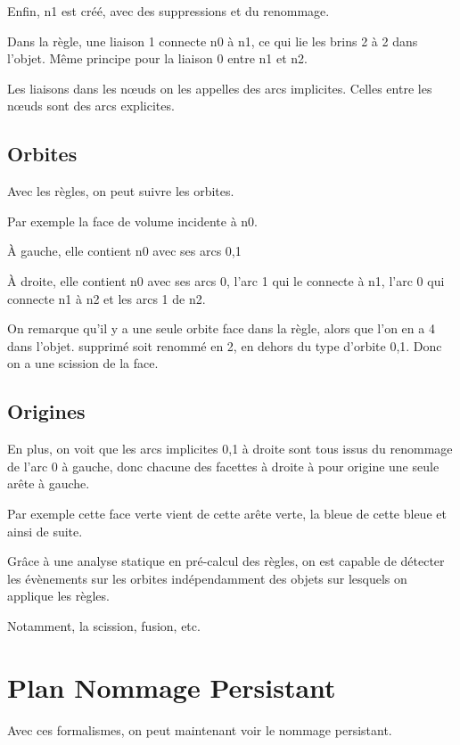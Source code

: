 \documentclass[11pt]{article}
\begin{document}
Enfin, n1 est créé, avec des suppressions et du renommage.

Dans la règle, une liaison 1 connecte n0 à n1, ce qui lie les brins 2 à 2 dans
l'objet. Même principe pour la liaison 0 entre n1 et n2.

Les liaisons dans les nœuds on les appelles des arcs implicites. Celles entre
les nœuds sont des arcs explicites.

\subsection{Orbites}
\label{sec:orgcf72bd7}

Avec les règles, on peut suivre les orbites.

Par exemple la face de volume incidente à n0.

À gauche, elle contient n0 avec ses arcs 0,1

À droite, elle contient n0 avec ses arcs 0, l'arc 1 qui le connecte à n1, l'arc
0 qui connecte n1 à n2 et les arcs 1 de n2.

On remarque qu'il y a une seule orbite face dans la règle, alors que l'on en a 4
dans l'objet. %
supprimé soit renommé en 2, en dehors du type d'orbite 0,1. Donc on a une
scission de la face. %

\subsection{Origines}
\label{sec:org341560c}

En plus, on voit que les arcs implicites 0,1 à droite sont tous issus du
renommage de l'arc 0 à gauche, donc chacune des facettes à droite à pour origine
une seule arête à gauche. %

Par exemple cette face verte vient de cette arête verte, la bleue de cette bleue
et ainsi de suite.

Grâce à une analyse statique en pré-calcul des règles, on est capable de
détecter les évènements sur les orbites indépendamment des objets sur lesquels
on applique les règles.

Notamment, la scission, fusion, etc.

\section{Plan Nommage Persistant}
\label{sec:orgaa5036e}

Avec ces formalismes, on peut maintenant voir le nommage persistant.
\end{document}
